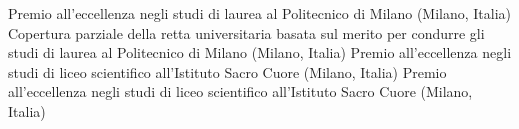 \documentclass[
  a4paper, 
]{fortysecondscv}
\begin{document}
\begin{cvtable}
		{{\small Premio all'eccellenza negli studi di laurea al Politecnico di Milano (Milano, Italia)}}
		{{\small Copertura parziale della retta universitaria basata sul merito per condurre gli studi di laurea al Politecnico di Milano (Milano, Italia)}}
		{{\small Premio all'eccellenza negli studi di liceo scientifico all'Istituto Sacro Cuore (Milano, Italia)}}
		{{\small Premio all'eccellenza negli studi di liceo scientifico all'Istituto Sacro Cuore (Milano, Italia)}}
\end{cvtable}
\end{document}
